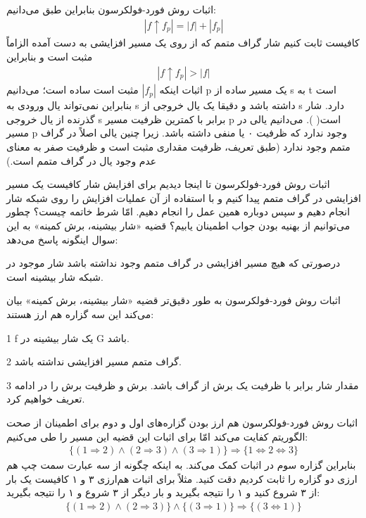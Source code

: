 \begin{itemframe}{اثبات روش فورد-فولکرسون}
\itm
بنابراین طبق
می‌دانیم:
\begin{align*}
|f \uparrow f_p| = |f| + |f_p|
\end{align*}
\itm
کافیست ثابت کنیم شار گراف متمم که از روی یک مسیر افزایشی به دست آمده الزاماً مثبت است و بنابراین
\begin{align*}
|f \uparrow f_p| > |f|
\end{align*}
\itm
اثبات اینکه
$|f_p|$
مثبت است ساده است؛ می‌دانیم p یک مسیر ساده از s به t است بنابراین نمی‌تواند یال ورودی به s داشته باشد و دقیقا یک یال خروجی از s دارد.
\itm
شار گذرنده از یال خروجی s برابر با کمترین ظرفیت مسیر p است(
).  می‌دانیم یالی در مسیر p وجود ندارد که ظرفیت ۰ یا منفی داشته باشد. زیرا چنین یالی اصلاً در گراف متمم وجود ندارد (طبق تعریف، ظرفیت مقداری مثبت است و ظرفیت صفر به معنای عدم وجود یال در گراف متمم است.)
\end{itemframe}


\begin{itemframe}{اثبات روش فورد-فولکرسون}
\itm
تا اینجا دیدیم برای افزایش شار کافیست یک مسیر افزایشی در گراف متمم پیدا کنیم و با استفاده از آن عملیات افزایش را روی شبکه شار انجام دهیم و سپس دوباره همین عمل را انجام دهیم. امّا شرط خاتمه چیست؟ چطور می‌توانیم از بهنیه بودن جواب اطمینان یابیم؟
\itm
قضیه «شار بیشینه، برش کمینه»
به این سوال اینگونه پاسخ می‌دهد:

درصورتی که هیچ مسیر افزایشی در گراف متمم وجود نداشته باشد شار موجود در شبکه شار بیشینه است.
\end{itemframe}


\begin{itemframe}{اثبات روش فورد-فولکرسون}
\itm
به طور دقیق‌تر قضیه «شار بیشینه، برش کمینه» بیان می‌کند این سه گزاره هم ارز هستند:
\item[1]
f یک شار بیشینه در G باشد.
\item[2]
گراف متمم  مسیر افزایشی نداشته باشد.
\item[3]
مقدار شار برابر با ظرفیت یک برش از گراف باشد.
\itm
برش و ظرفیت برش را در ادامه تعریف خواهیم کرد.
\end{itemframe}

\begin{itemframe}{اثبات روش فورد-فولکرسون}
\itm
هم ارز بودن گزاره‌های اول و دوم برای اطمینان از صحت الگوریتم کفایت می‌کند امّا برای اثبات این قضیه این مسیر را طی می‌کنیم:
\begin{align*}
\{(1 \Rightarrow 2) \land (2 \Rightarrow 3) \land (3 \Rightarrow 1)\}
\Rightarrow
\{1 \Leftrightarrow 2 \Leftrightarrow 3 \}
\end{align*}
\itm
بنابراین گزاره سوم در اثبات کمک می‌کند. به اینکه چگونه از سه عبارت سمت چپ هم ارزی دو گزاره را ثابت کردیم دقت کنید. مثلاً برای اثبات هم‌ارزی ۳ و ۱ کافیست یک بار از ۳ شروع کنید و ۱ را نتیجه بگیرید و بار دیگر از ۳ شروع و ۱ را نتیجه بگیرید:
\begin{align*}
\{(1 \Rightarrow 2) \land (2 \Rightarrow 3)\}
\land
\{(3 \Rightarrow 1)\}
\Rightarrow
\{(3 \Leftrightarrow 1)\}
\end{align*}

\end{itemframe}


